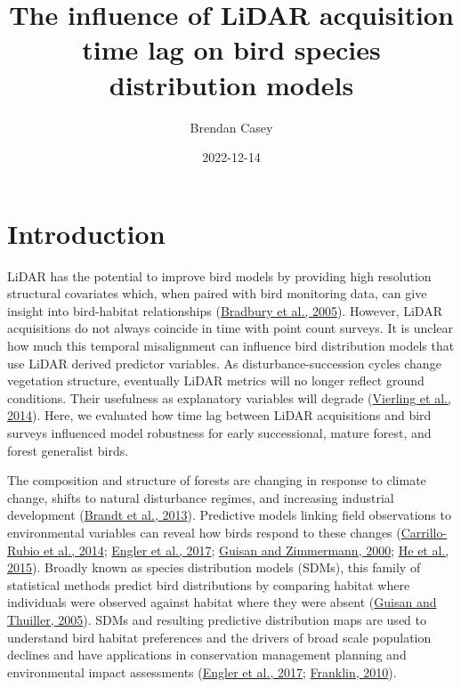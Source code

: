 \documentclass[
]{article}
\title{The influence of LiDAR acquisition time lag on bird species distribution models}
\author{Brendan Casey}
\date{2022-12-14}
\begin{document}
\maketitle

{
\hypersetup{linkcolor=}
\setcounter{tocdepth}{2}
\tableofcontents
}
\hypertarget{introduction}{%
\section{Introduction}\label{introduction}}

LiDAR has the potential to improve bird models by providing high resolution structural covariates which, when paired with bird monitoring data, can give insight into bird-habitat relationships (\protect\hyperlink{ref-Bradbury2005}{Bradbury et al., 2005}). However, LiDAR acquisitions do not always coincide in time with point count surveys. It is unclear how much this temporal misalignment can influence bird distribution models that use LiDAR derived predictor variables. As disturbance-succession cycles change vegetation structure, eventually LiDAR metrics will no longer reflect ground conditions. Their usefulness as explanatory variables will degrade (\protect\hyperlink{ref-VierlingSwift2014}{Vierling et al., 2014}). Here, we evaluated how time lag between LiDAR acquisitions and bird surveys influenced model robustness for early successional, mature forest, and forest generalist birds.

The composition and structure of forests are changing in response to climate change, shifts to natural disturbance regimes, and increasing industrial development (\protect\hyperlink{ref-Brandt2013}{Brandt et al., 2013}). Predictive models linking field observations to environmental variables can reveal how birds respond to these changes (\protect\hyperlink{ref-Carrillo-Rubio2014}{Carrillo-Rubio et al., 2014}; \protect\hyperlink{ref-englerAvianSDMsCurrent2017}{Engler et al., 2017}; \protect\hyperlink{ref-guisanPredictiveHabitatDistribution2000}{Guisan and Zimmermann, 2000}; \protect\hyperlink{ref-He2015}{He et al., 2015}). Broadly known as species distribution models (SDMs), this family of statistical methods predict bird distributions by comparing habitat where individuals were observed against habitat where they were absent (\protect\hyperlink{ref-Guisan2005}{Guisan and Thuiller, 2005}). SDMs and resulting predictive distribution maps are used to understand bird habitat preferences and the drivers of broad scale population declines and have applications in conservation management planning and environmental impact assessments (\protect\hyperlink{ref-englerAvianSDMsCurrent2017}{Engler et al., 2017}; \protect\hyperlink{ref-franklinMappingSpeciesDistributions2010}{Franklin, 2010}).
\end{document}
